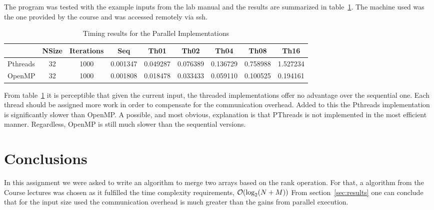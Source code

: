 The program was tested with the example inputs from the lab manual and the results are summarized in table~\ref{tbl:results}. The machine used was the one provided by the course and was accessed remotely via ssh.

\begin{table}[H]
\centering
\begin{tabular}{lcccccccc}
         & NSize & Iterations & Seq      & Th01      & Th02      & Th04      & Th08      & Th16
\\\midrule
Pthreads	&  32 &     1000 & 0.001347 &  0.049287 &  0.076389 &  0.136729 &  0.758988 &  1.527234\\
OpenMP		&  32 &     1000 & 0.001808 &  0.018478 &  0.033433 &  0.059110 &  0.100525 &  0.194161
\end{tabular}
\caption{Timing results for the Parallel Implementations}
\label{tbl:results}
\end{table}

From table~\ref{tbl:results} it is perceptible that given the current input, the threaded implementations offer no advantage over the sequential one. Each thread should be assigned more work in order to compensate for the communication overhead. Added to this the Pthreads implementation is significantly slower than OpenMP. A possible, and most obvious, explanation is that PThreads is not implemented in the most efficient manner. Regardless, OpenMP is still much slower than the sequential versions.

\section{Conclusions}

In this assignment we were asked to write an algorithm to merge two arrays based on the rank operation. For that, a algorithm from the Course lectures was chosen as it fulfilled the time complexity requirements,  $\mathcal{O}(\log_2(N+M))$
From section~\ref{sec:results} one can conclude that for the input size used the communication overhead is much greater than the gains from parallel execution.
